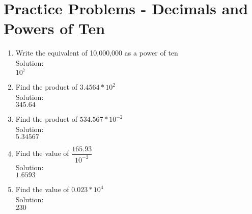 \section*{Practice Problems - Decimals and Powers of Ten}
\begin{enumerate}
\item Write the equivalent of 10,000,000 as a power of ten\\
Solution:\\
$\boxed{10^7}$
\item Find the product of $3.4564*10^2$\\
Solution:\\
$\boxed{345.64}$
\vspace{0.2cm}
\item Find the product of $534.567*10^{-2}$\\
Solution:\\
$\boxed{5.34567}$
\vspace{0.2cm}
\item Find the value of $\dfrac{165.93}{10^{-2}}$\\
Solution:\\
$\boxed{1.6593}$
\vspace{0.2cm}
\item Find the value of $0.023*10^4$\\
Solution:\\
$\boxed{230}$
\end{enumerate}
\newpage

